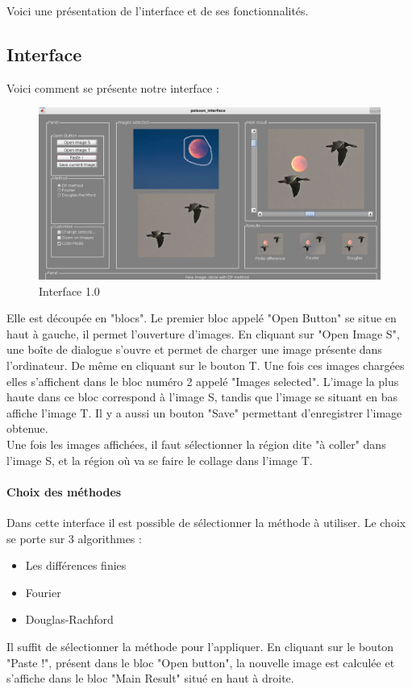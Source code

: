 Voici une présentation de l'interface et de ses fonctionnalités.

\subsection{Interface}
Voici comment se présente notre interface : 
\begin{figure}[!h]
    \centering
    \includegraphics[scale = 0.3]{Images/interface.png}
    \caption{Interface 1.0}
\end{figure}{}
Elle est découpée en "blocs". Le premier bloc appelé "Open Button" se situe en haut à gauche, il permet l'ouverture d'images. En cliquant sur "Open Image S", une boîte de dialogue s'ouvre et permet de charger une image présente dans l'ordinateur. De même en cliquant sur le bouton T. Une fois ces images chargées elles s'affichent dans le bloc numéro 2 appelé "Images selected". L'image la plus haute dans ce bloc correspond à l'image S, tandis que l'image se situant en bas affiche l'image T.
Il y a aussi un bouton "Save" permettant d'enregistrer l'image obtenue.\\ 
Une fois les images affichées, il faut sélectionner la région dite "à coller" dans l'image S, et la région où va se faire le collage dans l'image T.\\

\paragraph{Choix des méthodes}
Dans cette interface il est possible de sélectionner la méthode à utiliser. Le choix se porte sur 3 algorithmes : 
\begin{itemize}
    \item Les différences finies
    \item Fourier 
    \item Douglas-Rachford
\end{itemize}{}
Il suffit de sélectionner la méthode pour l'appliquer.
En cliquant sur le bouton "Paste !", présent dans le bloc "Open button", la nouvelle image est calculée et s'affiche dans le bloc "Main Result" situé en haut à droite. 
